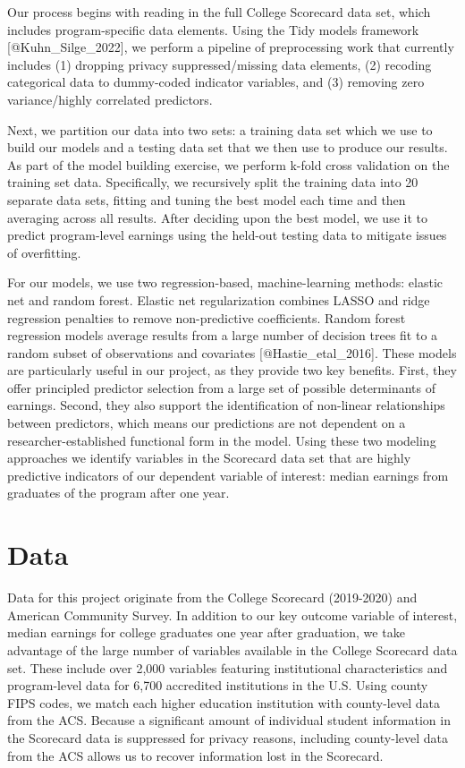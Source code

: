 Our process begins with reading in the full College Scorecard data set,
which includes program-specific data elements. Using the Tidy models
framework {[}@Kuhn\_Silge\_2022{]}, we perform a pipeline of
preprocessing work that currently includes (1) dropping privacy
suppressed/missing data elements, (2) recoding categorical data to
dummy-coded indicator variables, and (3) removing zero variance/highly
correlated predictors.

Next, we partition our data into two sets: a training data set which we
use to build our models and a testing data set that we then use to
produce our results. As part of the model building exercise, we perform
k-fold cross validation on the training set data. Specifically, we
recursively split the training data into 20 separate data sets, fitting
and tuning the best model each time and then averaging across all
results. After deciding upon the best model, we use it to predict
program-level earnings using the held-out testing data to mitigate
issues of overfitting.

For our models, we use two regression-based, machine-learning methods:
elastic net and random forest. Elastic net regularization combines LASSO
and ridge regression penalties to remove non-predictive coefficients.
Random forest regression models average results from a large number of
decision trees fit to a random subset of observations and covariates
{[}@Hastie\_etal\_2016{]}. These models are particularly useful in our
project, as they provide two key benefits. First, they offer principled
predictor selection from a large set of possible determinants of
earnings. Second, they also support the identification of non-linear
relationships between predictors, which means our predictions are not
dependent on a researcher-established functional form in the model.
Using these two modeling approaches we identify variables in the
Scorecard data set that are highly predictive indicators of our
dependent variable of interest: median earnings from graduates of the
program after one year.

\hypertarget{data}{%
\section{Data}\label{data}}

Data for this project originate from the College Scorecard (2019-2020)
and American Community Survey. In addition to our key outcome variable
of interest, median earnings for college graduates one year after
graduation, we take advantage of the large number of variables available
in the College Scorecard data set. These include over 2,000 variables
featuring institutional characteristics and program-level data for 6,700
accredited institutions in the U.S. Using county FIPS codes, we match
each higher education institution with county-level data from the ACS.
Because a significant amount of individual student information in the
Scorecard data is suppressed for privacy reasons, including county-level
data from the ACS allows us to recover information lost in the
Scorecard.

